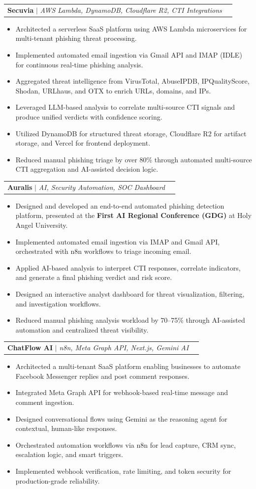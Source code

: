 \documentclass[letterpaper,11pt]{article}
\makeatletter
\newcommand{\resumeItem}[1]{
  \item\small{
    {#1 \vspace{-2pt}}
  }
}
\newcommand{\resumeProjectHeading}[2]{
    \item
    \begin{tabular*}{0.97\textwidth}{l@{\extracolsep{\fill}}r}
      \small#1 & #2 \\
    \end{tabular*}\vspace{-7pt}
}
\newcommand{\resumeItemListStart}{\begin{itemize}}
\newcommand{\resumeItemListEnd}{\end{itemize}\vspace{-5pt}}
\makeatother
\begin{document}
  \resumeProjectHeading
    {\textbf{Secuvia} $|$ \emph{AWS Lambda, DynamoDB, Cloudflare R2, CTI Integrations}}{}
    \resumeItemListStart
      \resumeItem{Architected a serverless SaaS platform using AWS Lambda microservices for multi-tenant phishing threat processing.}
      \resumeItem{Implemented automated email ingestion via Gmail API and IMAP (IDLE) for continuous real-time phishing analysis.}
      \resumeItem{Aggregated threat intelligence from VirusTotal, AbuseIPDB, IPQualityScore, Shodan, URLhaus, and OTX to enrich URLs, domains, and IPs.}
      \resumeItem{Leveraged LLM-based analysis to correlate multi-source CTI signals and produce unified verdicts with confidence scoring.}
      \resumeItem{Utilized DynamoDB for structured threat storage, Cloudflare R2 for artifact storage, and Vercel for frontend deployment.}
      \resumeItem{Reduced manual phishing triage by over 80\% through automated multi-source CTI aggregation and AI-assisted decision logic.}
    \resumeItemListEnd

  \resumeProjectHeading
    {\textbf{Auralis} $|$ \emph{AI, Security Automation, SOC Dashboard}}{}
    \resumeItemListStart
      \resumeItem{Designed and developed an end-to-end automated phishing detection platform, presented at the \textbf{First AI Regional Conference (GDG)} at Holy Angel University.}
      \resumeItem{Implemented automated email ingestion via IMAP and Gmail API, orchestrated with n8n workflows to triage incoming email.}
      \resumeItem{Applied AI-based analysis to interpret CTI responses, correlate indicators, and generate a final phishing verdict and risk score.}
      \resumeItem{Designed an interactive analyst dashboard for threat visualization, filtering, and investigation workflows.}
      \resumeItem{Reduced manual phishing analysis workload by 70--75\% through AI-assisted automation and centralized threat visibility.}
    \resumeItemListEnd

  \resumeProjectHeading
    {\textbf{ChatFlow AI} $|$ \emph{n8n, Meta Graph API, Next.js, Gemini AI}}{}
    \resumeItemListStart
      \resumeItem{Architected a multi-tenant SaaS platform enabling businesses to automate Facebook Messenger replies and post comment responses.}
      \resumeItem{Integrated Meta Graph API for webhook-based real-time message and comment ingestion.}
      \resumeItem{Designed conversational flows using Gemini as the reasoning agent for contextual, human-like responses.}
      \resumeItem{Orchestrated automation workflows via n8n for lead capture, CRM sync, escalation logic, and smart triggers.}
      \resumeItem{Implemented webhook verification, rate limiting, and token security for production-grade reliability.}
    \resumeItemListEnd
\end{document}
